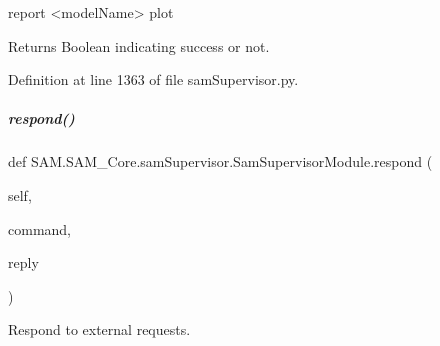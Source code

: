 \begin{DoxyCode}
report <modelName> plot
\end{DoxyCode}


\begin{DoxyParagraph}{Returns}
Boolean indicating success or not. 
\end{DoxyParagraph}


Definition at line 1363 of file sam\+Supervisor.\+py.

\mbox{\label{group__icubclient__SAM__Core_ad7eb8bb6937e3837b41c50a0bf7e1c59}} 
\subparagraph{\texorpdfstring{respond()}{respond()}}
{\footnotesize\ttfamily def S\+A\+M.\+S\+A\+M\+\_\+\+Core.\+sam\+Supervisor.\+Sam\+Supervisor\+Module.\+respond (\begin{DoxyParamCaption}\item[{}]{self,  }\item[{}]{command,  }\item[{}]{reply }\end{DoxyParamCaption})}



Respond to external requests. 

